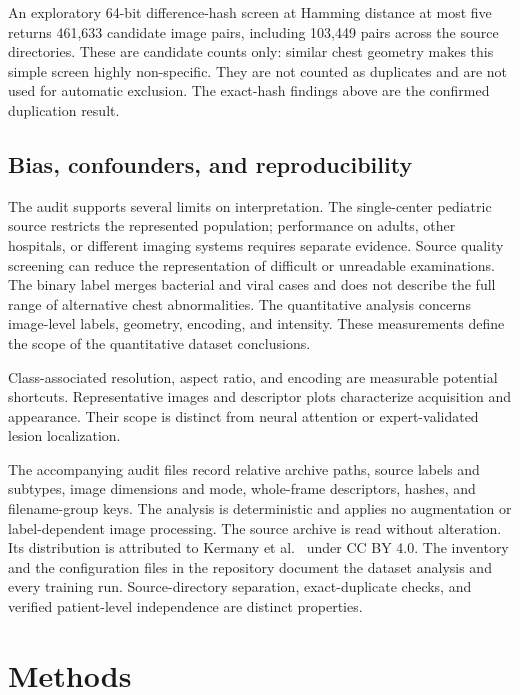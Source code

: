 \documentclass[12pt,letterpaper]{article}
\begin{document}
An exploratory 64-bit difference-hash screen at Hamming distance at most five returns 461,633 candidate image pairs, including 103,449 pairs across the source directories. These are candidate counts only: similar chest geometry makes this simple screen highly non-specific. They are not counted as duplicates and are not used for automatic exclusion. The exact-hash findings above are the confirmed duplication result.

\subsection{Bias, confounders, and reproducibility}
The audit supports several limits on interpretation. The single-center pediatric source restricts the represented population; performance on adults, other hospitals, or different imaging systems requires separate evidence. Source quality screening can reduce the representation of difficult or unreadable examinations. The binary label merges bacterial and viral cases and does not describe the full range of alternative chest abnormalities. The quantitative analysis concerns image-level labels, geometry, encoding, and intensity. These measurements define the scope of the quantitative dataset conclusions.

Class-associated resolution, aspect ratio, and encoding are measurable potential shortcuts. Representative images and descriptor plots characterize acquisition and appearance. Their scope is distinct from neural attention or expert-validated lesion localization.

The accompanying audit files record relative archive paths, source labels and subtypes, image dimensions and mode, whole-frame descriptors, hashes, and filename-group keys. The analysis is deterministic and applies no augmentation or label-dependent image processing. The source archive is read without alteration. Its distribution is attributed to Kermany et al.\ \cite{kermanydata} under CC BY 4.0. The inventory and the configuration files in the repository document the dataset analysis and every training run. Source-directory separation, exact-duplicate checks, and verified patient-level independence are distinct properties.

\FloatBarrier

\section{Methods}
\label{sec:methods}
\end{document}
